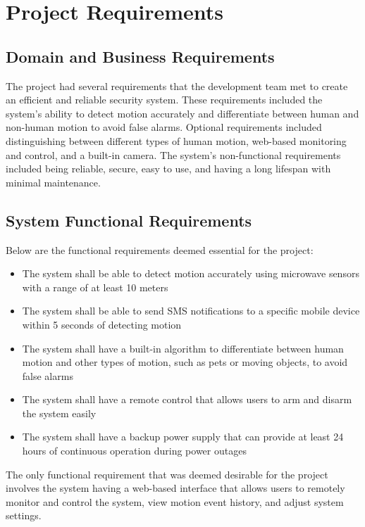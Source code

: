 \section{Project Requirements}\label{sec:project-requirements}

\subsection{Domain and Business Requirements}\label{subsec:domain-and-business-requirements}
The \brand{} project had several requirements that the development team met to
create an efficient and reliable security system. %
These requirements included the system's ability to detect motion accurately and differentiate between human and
non-human motion to avoid false alarms. %
Optional requirements included distinguishing between different types of human motion, web-based monitoring and control, and a
built-in camera. %
The system's non-functional requirements included being reliable, secure,
easy to use, and having a long lifespan with minimal maintenance. %

\subsection{System Functional Requirements}\label{subsec:system-functional-requirements}

Below are the functional requirements deemed essential for the project:
\begin{itemize}
    \item The system shall be able to detect motion accurately using microwave sensors with a range of at least 10 meters
    \item The system shall be able to send SMS notifications to a specific mobile device within 5 seconds of detecting motion
    \item The system shall have a built-in algorithm to differentiate between human motion and other types of motion, such as pets or moving objects, to avoid false alarms
    \item The system shall have a remote control that allows users to arm and disarm the system easily
    \item The system shall have a backup power supply that can provide at least 24 hours of continuous operation during power outages
\end{itemize}

The only functional requirement that was deemed desirable for the project involves the
system having a web-based interface that allows users to remotely monitor and control the
system, view motion event history, and adjust system settings. %

